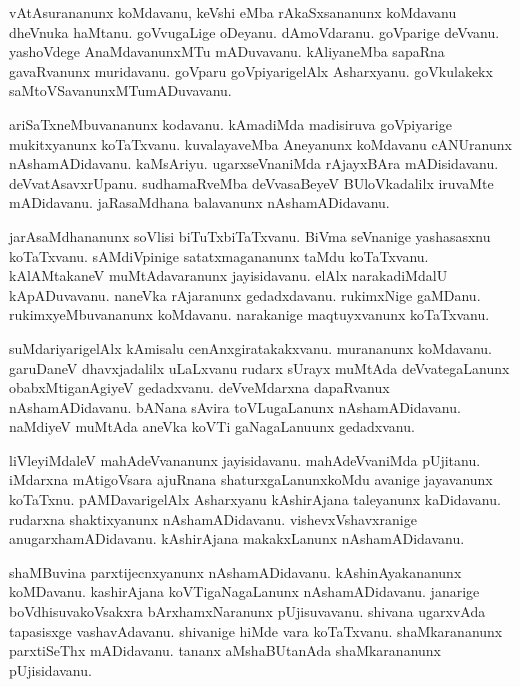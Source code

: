 \documentclass{article}
\begin{document}
\begin{mn}%
vAtAsurananunx koMdavanu, keVshi eMba rAkaSxsananunx koMdavanu dheVnuka haMtanu. goVvugaLige 
oDeyanu. dAmoVdaranu. goVparige deVvanu. yashoVdege AnaMdavanunxMTu mADuvavanu. kAliyaneMba 
sapaRna gavaRvanunx muridavanu. goVparu goVpiyarigelAlx Asharxyanu. goVkulakekx 
saMtoVSavanunxMTumADuvavanu.
\end{mn}

\begin{mn}%
ariSaTxneMbuvananunx kodavanu. kAmadiMda madisiruva goVpiyarige mukitxyanunx koTaTxvanu. 
kuvalayaveMba Aneyanunx koMdavanu cANUranunx nAshamADidavanu. kaMsAriyu. ugarxseVnaniMda rAjayxBAra 
mADisidavanu. deVvatAsavxrUpanu. sudhamaRveMba deVvasaBeyeV BUloVkadalilx iruvaMte mADidavanu. 
jaRasaMdhana balavanunx nAshamADidavanu.
\end{mn}

\begin{mn}%
jarAsaMdhananunx soVlisi biTuTxbiTaTxvanu. BiVma seVnanige yashasasxnu koTaTxvanu. sAMdiVpinige 
satatxmagananunx taMdu koTaTxvanu. kAlAMtakaneV muMtAdavaranunx jayisidavanu. elAlx narakadiMdalU 
kApADuvavanu. naneVka rAjaranunx gedadxdavanu. rukimxNige gaMDanu. rukimxyeMbuvananunx koMdavanu. 
narakanige maqtuyxvanunx koTaTxvanu.
\end{mn}

\begin{mn}%
suMdariyarigelAlx kAmisalu cenAnxgiratakakxvanu. murananunx koMdavanu. garuDaneV dhavxjadalilx 
uLaLxvanu rudarx sUrayx muMtAda deVvategaLanunx  obabxMtiganAgiyeV gedadxvanu. deVveMdarxna 
dapaRvanux nAshamADidavanu. bANana sAvira toVLugaLanunx nAshamADidavanu. naMdiyeV muMtAda aneVka 
koVTi gaNagaLanuunx gedadxvanu.
\end{mn}

\begin{mn}%
liVleyiMdaleV mahAdeVvananunx jayisidavanu. mahAdeVvaniMda pUjitanu. iMdarxna mAtigoVsara ajuRnana 
shaturxgaLanunxkoMdu avanige jayavanunx koTaTxnu. pAMDavarigelAlx Asharxyanu kAshirAjana 
taleyanunx kaDidavanu. rudarxna shaktixyanunx nAshamADidavanu. vishevxVshavxranige 
anugarxhamADidavanu. kAshirAjana makakxLanunx nAshamADidavanu.
\end{mn}

\begin{mn}%
shaMBuvina parxtijecnxyanunx nAshamADidavanu. kAshinAyakananunx koMDavanu. kashirAjana 
koVTigaNagaLanunx nAshamADidavanu. janarige boVdhisuvakoVsakxra bArxhamxNaranunx pUjisuvavanu. 
shivana ugarxvAda tapasisxge vashavAdavanu. shivanige hiMde vara koTaTxvanu. shaMkarananunx 
parxtiSeThx mADidavanu. tananx aMshaBUtanAda shaMkarananunx pUjisidavanu.
\end{mn}
\end{document}

